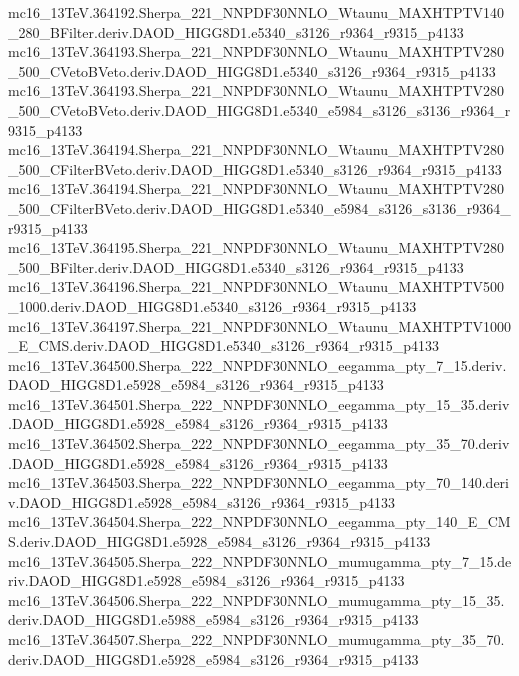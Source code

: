 mc16_13TeV.364192.Sherpa_221_NNPDF30NNLO_Wtaunu_MAXHTPTV140_280_BFilter.deriv.DAOD_HIGG8D1.e5340_s3126_r9364_r9315_p4133 \\
mc16_13TeV.364193.Sherpa_221_NNPDF30NNLO_Wtaunu_MAXHTPTV280_500_CVetoBVeto.deriv.DAOD_HIGG8D1.e5340_s3126_r9364_r9315_p4133 \\
mc16_13TeV.364193.Sherpa_221_NNPDF30NNLO_Wtaunu_MAXHTPTV280_500_CVetoBVeto.deriv.DAOD_HIGG8D1.e5340_e5984_s3126_s3136_r9364_r9315_p4133 \\
mc16_13TeV.364194.Sherpa_221_NNPDF30NNLO_Wtaunu_MAXHTPTV280_500_CFilterBVeto.deriv.DAOD_HIGG8D1.e5340_s3126_r9364_r9315_p4133 \\
mc16_13TeV.364194.Sherpa_221_NNPDF30NNLO_Wtaunu_MAXHTPTV280_500_CFilterBVeto.deriv.DAOD_HIGG8D1.e5340_e5984_s3126_s3136_r9364_r9315_p4133 \\
mc16_13TeV.364195.Sherpa_221_NNPDF30NNLO_Wtaunu_MAXHTPTV280_500_BFilter.deriv.DAOD_HIGG8D1.e5340_s3126_r9364_r9315_p4133 \\
mc16_13TeV.364196.Sherpa_221_NNPDF30NNLO_Wtaunu_MAXHTPTV500_1000.deriv.DAOD_HIGG8D1.e5340_s3126_r9364_r9315_p4133 \\
mc16_13TeV.364197.Sherpa_221_NNPDF30NNLO_Wtaunu_MAXHTPTV1000_E_CMS.deriv.DAOD_HIGG8D1.e5340_s3126_r9364_r9315_p4133 \\
mc16_13TeV.364500.Sherpa_222_NNPDF30NNLO_eegamma_pty_7_15.deriv.DAOD_HIGG8D1.e5928_e5984_s3126_r9364_r9315_p4133 \\
mc16_13TeV.364501.Sherpa_222_NNPDF30NNLO_eegamma_pty_15_35.deriv.DAOD_HIGG8D1.e5928_e5984_s3126_r9364_r9315_p4133 \\
mc16_13TeV.364502.Sherpa_222_NNPDF30NNLO_eegamma_pty_35_70.deriv.DAOD_HIGG8D1.e5928_e5984_s3126_r9364_r9315_p4133 \\
mc16_13TeV.364503.Sherpa_222_NNPDF30NNLO_eegamma_pty_70_140.deriv.DAOD_HIGG8D1.e5928_e5984_s3126_r9364_r9315_p4133 \\
mc16_13TeV.364504.Sherpa_222_NNPDF30NNLO_eegamma_pty_140_E_CMS.deriv.DAOD_HIGG8D1.e5928_e5984_s3126_r9364_r9315_p4133 \\
mc16_13TeV.364505.Sherpa_222_NNPDF30NNLO_mumugamma_pty_7_15.deriv.DAOD_HIGG8D1.e5928_e5984_s3126_r9364_r9315_p4133 \\
mc16_13TeV.364506.Sherpa_222_NNPDF30NNLO_mumugamma_pty_15_35.deriv.DAOD_HIGG8D1.e5988_e5984_s3126_r9364_r9315_p4133 \\
mc16_13TeV.364507.Sherpa_222_NNPDF30NNLO_mumugamma_pty_35_70.deriv.DAOD_HIGG8D1.e5928_e5984_s3126_r9364_r9315_p4133 \\
